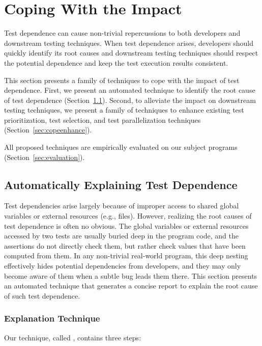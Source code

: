 \section{Coping With the Impact}
\label{sec:cope}

Test dependence can cause non-trivial repercussions
to both developers and downstream testing techniques.
When test dependence arises, developers should quickly
identify its root causes and downstream testing techniques
should respect the potential dependence and keep the
test execution results consistent.

This section presents a family of techniques to cope with the
impact of test dependence. First, we present an automated
technique to identify the root cause of test dependence
(Section~\ref{sec:coperoot}). Second, to alleviate the
impact on downstream testing techniques, we present a family
of techniques to enhance existing test prioritization,
test selection, and test parallelization techniques (Section~\ref{sec:copeenhance}).

All proposed techniques are empirically evaluated on
our subject programs (Section~\ref{sec:evaluation}).

\subsection{Automatically Explaining Test Dependence}
\label{sec:coperoot}


Test dependencies arise largely because of improper access
to shared global variables or external resources (e.g., files).
However, realizing the root causes of test dependence is often no
obvious.
The global variables or external resources 
accessed by two tests are usually buried deep in
the program code, and the assertions do not directly check
them, but rather check values that have been computed from
them. In any non-trivial real-world program, this deep
nesting effectively hides potential dependencies from developers,
and they may only become aware of them when a subtle bug
leads them there. This section presents an automated
technique that generates a concise report to explain the
root cause of such test dependence.


\subsubsection{Explanation Technique}

Our technique, called \dtexplain, contains three steps:

